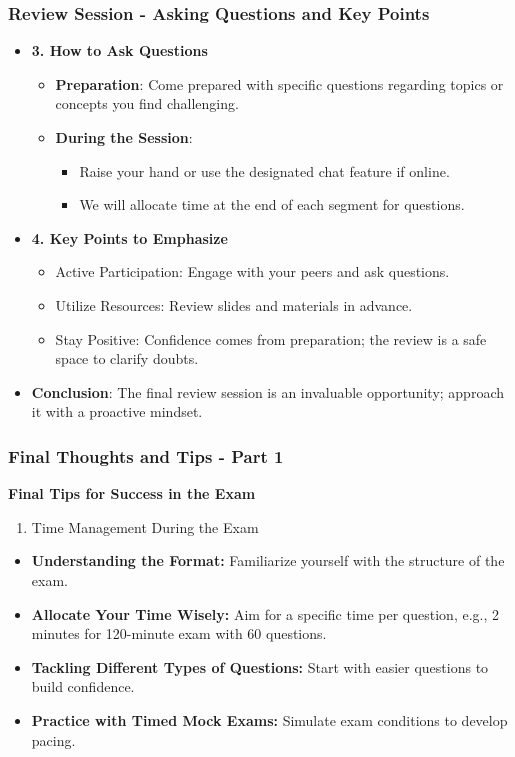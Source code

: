 \documentclass{beamer}
\begin{document}
\begin{frame}[fragile]
    \frametitle{Review Session - Asking Questions and Key Points}
    \begin{itemize}
        \item \textbf{3. How to Ask Questions}
        \begin{itemize}
            \item \textbf{Preparation}: Come prepared with specific questions regarding topics or concepts you find challenging.
            \item \textbf{During the Session}: 
            \begin{itemize}
                \item Raise your hand or use the designated chat feature if online.
                \item We will allocate time at the end of each segment for questions.
            \end{itemize}
        \end{itemize}
        \item \textbf{4. Key Points to Emphasize}
        \begin{itemize}
            \item Active Participation: Engage with your peers and ask questions.
            \item Utilize Resources: Review slides and materials in advance.
            \item Stay Positive: Confidence comes from preparation; the review is a safe space to clarify doubts.
        \end{itemize}
        \item \textbf{Conclusion}: The final review session is an invaluable opportunity; approach it with a proactive mindset.
    \end{itemize}
\end{frame}

\begin{frame}[fragile]
    \frametitle{Final Thoughts and Tips - Part 1}
    \textbf{Final Tips for Success in the Exam}

    \begin{enumerate}
        \item Time Management During the Exam
    \end{enumerate}

    \begin{itemize}
        \item \textbf{Understanding the Format:} Familiarize yourself with the structure of the exam.
        \item \textbf{Allocate Your Time Wisely:} Aim for a specific time per question, e.g., 2 minutes for 120-minute exam with 60 questions.
        \item \textbf{Tackling Different Types of Questions:} Start with easier questions to build confidence.
        \item \textbf{Practice with Timed Mock Exams:} Simulate exam conditions to develop pacing.
    \end{itemize}
\end{frame}
\end{document}
